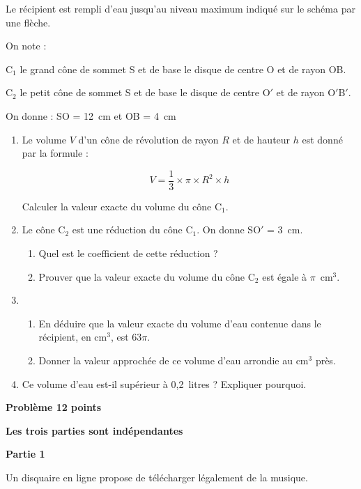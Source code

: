 \documentclass[10pt]{article}
\begin{document}
Le récipient est rempli d'eau jusqu'au niveau maximum indiqué sur le schéma par une flèche.

On note :

\quad  C$_{1}$ le grand cône de sommet S et de base le disque de centre O et de rayon OB.

\quad  C$_{2}$ le petit cône de sommet S et de base le disque de centre O$'$ et de rayon O$'$B$'$.

On donne : SO = 12~cm et OB = 4~cm

\medskip

\begin{enumerate}
\item  Le volume $V$ d'un cône de révolution de rayon $R$ et de hauteur $h$ est donné par la formule :

\[ V = \dfrac{1}{3}\times \pi \times R^2 \times h\]

Calculer la valeur exacte du volume du cône C$_{1}$.
\item  Le cône C$_{2}$ est une réduction du cône C$_{1}$. On donne SO$'$ = 3~cm.
	\begin{enumerate}
		\item  Quel est le coefficient de cette réduction ?
		\item  Prouver que la valeur exacte du volume du cône C$_{2}$ est égale à $\pi$~cm$^3$.
	\end{enumerate}
\item 
	\begin{enumerate}
		\item  En déduire que la valeur exacte du volume d'eau contenue dans le récipient, en cm$^3$, est $63\pi$. 
		\item  Donner la valeur approchée de ce volume d'eau arrondie au cm$^3$ près. 
	\end{enumerate}
\item Ce volume d'eau est-il supérieur à 0,2~litres ? Expliquer pourquoi.
\end{enumerate}

\newpage

\textbf{Problème \hfill 12 points}

\medskip

\begin{center}
\textbf{Les trois parties sont indépendantes}
\end{center}

\textbf{Partie 1}

\medskip

Un disquaire en ligne propose de télécharger légalement de la musique.
\end{document}
